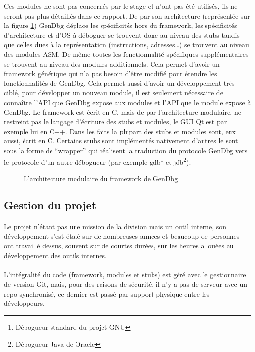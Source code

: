 \documentclass[11pt, book, english, french, standardlists]{upmethodology-document}
\begin{document}
					Ces modules ne sont pas concernés par le stage et n'ont pas été utilisés, ils ne seront pas plus détaillés dans ce rapport.
					De par son architecture (représentée sur la figure \ref{fig:GenDbg_modules}) GenDbg déplace les spécificités hors du framework, les spécificités d'architecture et d'OS à déboguer se trouvent donc au niveau des stubs tandis que celles dues à la représentation (instructions, adresses\ldots) se trouvent au niveau des modules ASM. De même toutes les fonctionnalité spécifiques supplémentaires se trouvent au niveau des modules additionnels. Cela permet d'avoir un framework générique qui n'a pas besoin d'être modifié pour étendre les fonctionnalités de GenDbg. Cela permet aussi d'avoir un développement très ciblé, pour développer un nouveau module, il est seulement nécessaire de connaître l'\gls{API} que GenDbg expose aux modules et l'\gls{API} que le module expose à GenDbg.
					Le framework est écrit en C, mais de par l'architecture modulaire, ne restreint pas le langage d'écriture des stubs et modules, le \gls{GUI} Qt est par exemple lui en C++. Dans les faits la plupart des stubs et modules sont, eux aussi, écrit en C. Certains stubs sont implémentés nativement d'autres le sont sous la forme de ``wrapper'' qui réalisent la traduction du protocole GenDbg vers le protocole d'un autre débogueur (par exemple gdb\footnote{Débogueur standard du projet GNU} et jdb\footnote{Débogueur Java de Oracle}).
				\begin{figure}[H]
					\centering
					\caption{L'architecture modulaire du framework de GenDbg}
					\label{fig:GenDbg_modules}
				\end{figure}
			\subsection{Gestion du projet}
				\paragraph*{}
					Le projet n'étant pas une mission de la division mais un outil interne, son développement s'est étalé sur de nombreuses années et beaucoup de personnes ont travaillé dessus, souvent sur de courtes durées, sur les heures allouées au développement des outils internes.
				\paragraph*{}
					L'intégralité du code (framework, modules et stubs) est géré avec le gestionnaire de version Git, mais, pour des raisons de sécurité, il n'y a pas de serveur avec un repo synchronisé, ce dernier est passé par support physique entre les développeurs.
\end{document}
